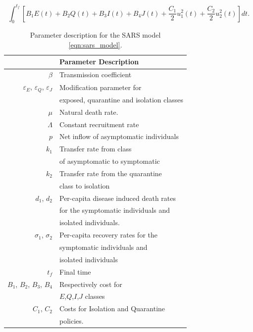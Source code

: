 \begin{equation}\label{eqn:sars_cost}
  \int_{0}^{t_f}
      \left[
        B_1 E(t)
        + B_2 Q(t)
        + B_3 I(t)
        + B_4 J(t)
        + \frac{C_1}{2} u_1^2 (t)
        + \frac{C_2}{2} u_2^2 (t)
      \right]
      dt.
\end{equation}
\newpage
\begin{table}
    \begin{center}
      \begin{tabular}{@{}rl@{}}
        \toprule
        & \multicolumn{1}{l}{\bf{Parameter Description}}
        \\
        \midrule
        $\beta$
          & Transmission coefficient
        \\
        $\varepsilon_E$, 
        $\varepsilon_Q$,
        $\varepsilon_J$
          & Modification parameter for 
          \\
          &  exposed, quarantine and isolation classes 
          \\
        $\mu$
          & Natural death rate.
        \\
        $\Lambda$
          & Constant recruitment rate
        \\
        $p$
          & Net inflow of asymptomatic individuals
        \\
        $k_1$ 
          & Transfer rate from class 
          \\
          & of asymptomatic to symptomatic
          \\
        $k_2$
          & Transfer rate from the quarantine 
          \\ 
          & class to isolation
        \\
        $d_1$, $d_2$
          & Per-capita disease induced death rates 
          \\
          & for the symptomatic individuals and 
          \\
          & isolated individuals.
        \\
        $\sigma_1$, $\sigma_2$
          & Per-capita recovery rates for the 
          \\
          & symptomatic individuals and 
          \\
          &  isolated individuals
        \\
        $t_f$
          & Final time 
        \\
        $B_1$, $B_2$, $B_3$, $B_4$
        & Respectively cost for 
        \\
        &
          $E$,$Q$,$I$,$J$ classes
        \\
        $C_1$, $C_2$
        & Costs for Isolation and Quarantine 
        \\
          & policies.
        \\
        \bottomrule
      \end{tabular}
     \caption{Parameter description for the SARS model
     \eqref{eqn:sars_model}.}
     \label{tbl:sars_table_des}
     \end{center}
\end{table}

